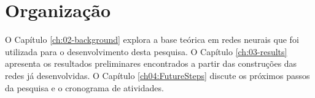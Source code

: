 \section{Organização}
\label{sec:organization}

O Capítulo \ref{ch:02-background} explora a base teórica em redes neurais que foi utilizada para o desenvolvimento desta pesquisa. O Capítulo \ref{ch:03-results} apresenta os resultados preliminares encontrados a partir das construções das redes já desenvolvidas. O Capítulo \ref{ch04:FutureSteps} discute os próximos passos da pesquisa e o cronograma de atividades.
